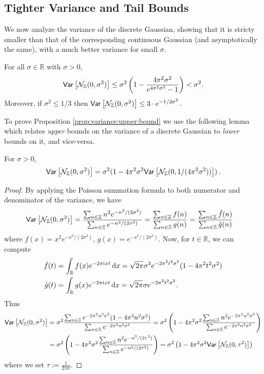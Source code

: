 \documentclass{jpcfinal} %
\newcommand{\ii}{\mathrm{i}\mkern1mu}
\newcommand{\var}[2]{{\ifx&#1& \mathsf{Var} \else
\underset{#1}{\mathsf{Var}} \fi \left[#2\right]}}
\newcommand{\eqdef}{:=}
\newcommand{\dx}[1][x]{\mathrm{d}#1}
\newcommand{\Z}{\mathbb{Z}}
\newcommand{\R}{\mathbb{R}}
\begin{document}
\subsection{Tighter Variance and Tail Bounds}
\label{sec:tighter-bounds}
We now analyze the variance of the discrete Gaussian, showing that it is stricty smaller than that of the corresponding continuous Gaussian (and asymptotically the same), with a much better variance for small $\sigma$.
\begin{prop}[Variance]
  \label{prop:variance:upper:bound}
    For all $\sigma \in \R$ with $\sigma>0$,
\begin{equation}
\var{}{\discN(0,\sigma^2)} \leq \sigma^2 \left(1 - \frac{4\pi^2\sigma^2}{e^{4\pi^2\sigma^2}-1} \right)<\sigma^2.
\end{equation}
Moreover, if $\sigma^2\le 1/3$ then $\var{}{\discN(0,\sigma^2)} \le 3 \cdot e^{-1/2\sigma^2}$.
\end{prop}
To prove Proposition \ref{prop:variance:upper:bound} we use the following lemma which relates \emph{upper} bounds on the variance of a discrete Gaussian to \emph{lower} bounds on it, and vice-versa.
\begin{lem}\label{lem:upper=lower}
For $\sigma>0$, 
\begin{equation}
    \label{eq:relation:variances}
\var{}{\discN(0,\sigma^2)} = \sigma^2 (1 - 4\pi^2\sigma^2\var{}{\discN(0,1/(4\pi^2\sigma^2))} )\,.
\end{equation}
\end{lem}
\begin{proof}
By applying the Poisson summation formula to both numerator and denominator of the variance, we have
\begin{align*}
    \var{}{\discN(0,\sigma^2)} 
    &= \frac{\sum_{n\in \Z} n^2 e^{-n^2/(2\sigma^2)}}{\sum_{n\in\Z} e^{-n^2/(2\sigma^2)}}
    = \frac{\sum_{n\in \Z} f(n)}{\sum_{n\in \Z} g(n)}
    = \frac{\sum_{n\in \Z} \hat{f}(n)}{\sum_{n\in \Z} \hat{g}(n)}
\end{align*}
where $f(x) = x^2 e^{-x^2/(2\sigma^2)}$, $g(x) = e^{-x^2/(2\sigma^2)}$. Now, for $t\in\R$, we can compute
\begin{align*}
    \hat{f}(t) &= \int_{\R} f(x) e^{-2\pi\ii{}x t}\,\dx = \sqrt{2\pi} \sigma^3 e^{-2\pi^2t^2\sigma^2} (1- 4\pi^2t^2\sigma^2)\\
    \hat{g}(t) &= \int_{\R} g(x) e^{-2\pi\ii{}x t}\,\dx = \sqrt{2\pi} \sigma e^{-2\pi^2t^2\sigma^2}.
\end{align*}
Thus
\begin{align*}
    \var{}{\discN(0,\sigma^2)} 
    &= \sigma^2\frac{\sum_{n\in \Z} e^{-2\pi^2n^2\sigma^2} (1- 4\pi^2n^2\sigma^2) }{\sum_{n\in \Z} e^{-2\pi^2n^2\sigma^2}}
    = \sigma^2\left( 1 - 4\pi^2\sigma^2\frac{\sum_{n\in \Z} n^2e^{-2\pi^2n^2\sigma^2} }{\sum_{n\in \Z} e^{-2\pi^2n^2\sigma^2}}\right) \\
    &= \sigma^2\left( 1 - 4\pi^2\sigma^2\frac{\sum_{n\in \Z} n^2 e^{-n^2/(2\tau^2)} }{\sum_{n\in \Z} e^{-n^2/(2\tau^2)}}\right)
    = \sigma^2\left( 1 - 4\pi^2\sigma^2\var{}{\discN(0,\tau^2)} \right)
\end{align*}
where we set $\tau \eqdef \frac{1}{2\pi\sigma}$.
\end{proof}
\end{document}
